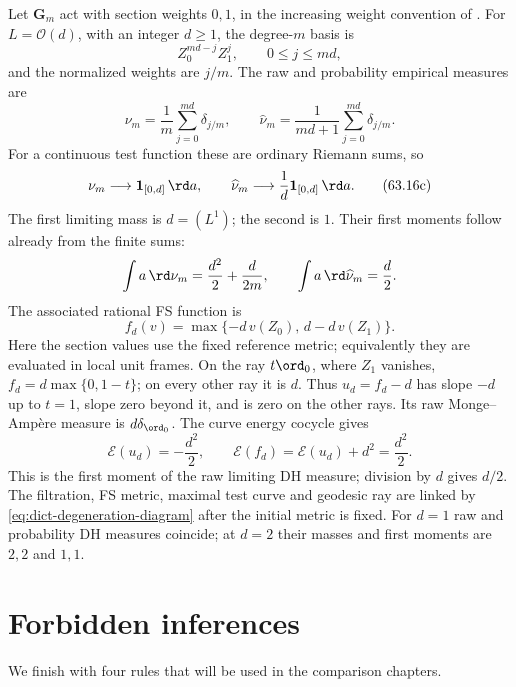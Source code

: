 \begin{example}
\label{ex:dict-product-action}
Let $\mathbf G_m$ act with section weights $0,1$, in the increasing
weight convention of . For
$L=\mathcal O(d)$, with an integer $d\geq1$, the degree-$m$ basis is
\[
 Z_0^{md-j}Z_1^j,\qquad 0\leq j\leq md,
\]
and the normalized weights are $j/m$. The raw and probability empirical
measures are
\[
 \nu_m=\frac1m\sum_{j=0}^{md}\delta_{j/m},\qquad
 \widehat\nu_m=\frac1{md+1}\sum_{j=0}^{md}\delta_{j/m}.
\tag{63.16b}\label{eq:dict-product-dh-empirical}
\]
For a continuous test function these are ordinary Riemann sums, so
\[
 \nu_m\longrightarrow\mathbf1_{[0,d]}\,\rd a,\qquad
 \widehat\nu_m\longrightarrow\frac1d\mathbf1_{[0,d]}\,\rd a.
\tag{63.16c}\label{eq:dict-product-dh-limits}
\]
The first limiting mass is $d=(L^1)$; the second is $1$.
Their first moments follow already from the finite sums:
\[
 \int a\,\rd\nu_m=\frac{d^2}{2}+\frac{d}{2m},
 \qquad
 \int a\,\rd\widehat\nu_m=\frac d2.
\]
The associated rational FS function is
\[
 f_d(v)=\max\{-d\,v(Z_0),\,d-d\,v(Z_1)\}.
\tag{63.16d}\label{eq:dict-product-fs-function}
\]
Here the section values use the fixed reference metric; equivalently
they are evaluated in local unit frames. On the ray $t\ord_0$, where
$Z_1$ vanishes, $f_d=d\max\{0,1-t\}$; on every other ray it is $d$.
Thus $u_d=f_d-d$ has slope $-d$ up to $t=1$, slope zero beyond it,
and is zero on the other rays. Its raw Monge--Amp\`ere measure is
$d\delta_{\ord_0}$. The curve energy cocycle gives
\[
 \mathscr E(u_d)=-\frac{d^2}{2},\qquad
 \mathscr E(f_d)=\mathscr E(u_d)+d^2=\frac{d^2}{2}.
\tag{63.16e}\label{eq:dict-product-energy-moment}
\]
This is the first moment of the raw limiting DH measure; division by
$d$ gives $d/2$. The filtration, FS metric, maximal test curve and
geodesic ray are linked by \eqref{eq:dict-degeneration-diagram} after
the initial metric is fixed. For $d=1$ raw and probability DH measures
coincide; at $d=2$ their masses and first moments are $2,2$ and $1,1$.
\end{example}

\section{Forbidden inferences}
\label{sec:dict-inferences}

We finish with four rules that will be used in the comparison chapters.

